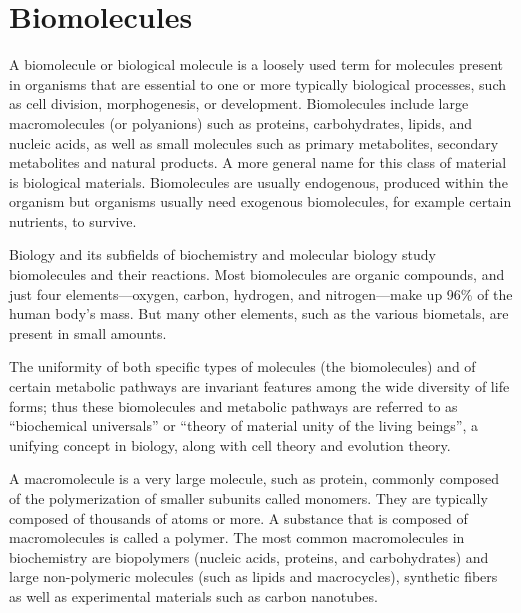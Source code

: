 \twocolumn
\hypertarget{biomolecules}{%
\section{Biomolecules}\label{biomolecules}}

A biomolecule or biological molecule is a loosely used term for molecules present in organisms that are essential to one or more typically biological processes, such as cell division, morphogenesis, or development. Biomolecules include large macromolecules (or polyanions) such as proteins, carbohydrates, lipids, and nucleic acids, as well as small molecules such as primary metabolites, secondary metabolites and natural products. A more general name for this class of material is biological materials. Biomolecules are usually endogenous, produced within the organism but organisms usually need exogenous biomolecules, for example certain nutrients, to survive.

Biology and its subfields of biochemistry and molecular biology study biomolecules and their reactions. Most biomolecules are organic compounds, and just four elements---oxygen, carbon, hydrogen, and nitrogen---make up 96\% of the human body's mass. But many other elements, such as the various biometals, are present in small amounts.

The uniformity of both specific types of molecules (the biomolecules) and of certain metabolic pathways are invariant features among the wide diversity of life forms; thus these biomolecules and metabolic pathways are referred to as ``biochemical universals'' or ``theory of material unity of the living beings'', a unifying concept in biology, along with cell theory and evolution theory.

A macromolecule is a very large molecule, such as protein, commonly composed of the polymerization of smaller subunits called monomers. They are typically composed of thousands of atoms or more. A substance that is composed of macromolecules is called a polymer. The most common macromolecules in biochemistry are biopolymers (nucleic acids, proteins, and carbohydrates) and large non-polymeric molecules (such as lipids and macrocycles), synthetic fibers as well as experimental materials such as carbon nanotubes.

